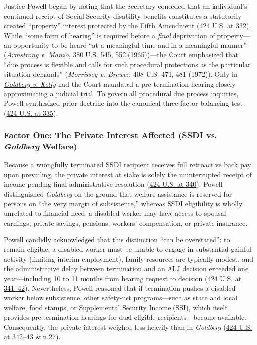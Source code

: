 \documentclass[12pt]{article}
\begin{document}
Justice Powell began by noting that the Secretary conceded that an individual's continued receipt of Social Security disability benefits constitutes a statutorily created ``property'' interest protected by the Fifth Amendment (\href{https://supreme.justia.com/cases/federal/us/424/319/}{424 U.S. at 332}). While ``some form of hearing'' is required before a \emph{final} deprivation of property---an opportunity to be heard ``at a meaningful time and in a meaningful manner'' (\emph{Armstrong v. Manzo}, 380 U.S. 545, 552 (1965))---the Court emphasized that ``due process is flexible and calls for such procedural protections as the particular situation demands'' (\emph{Morrissey v. Brewer}, 408 U.S. 471, 481 (1972)). Only in \href{https://supreme.justia.com/cases/federal/us/397/254/}{\emph{Goldberg v. Kelly}} had the Court mandated a pre-termination hearing closely approximating a judicial trial. To govern all procedural due process inquiries, Powell synthesized prior doctrine into the canonical three-factor balancing test (\href{https://supreme.justia.com/cases/federal/us/424/319/}{424 U.S. at 335}).

\subsubsection{Factor One: The Private Interest Affected (SSDI vs. \emph{Goldberg} Welfare)}

Because a wrongfully terminated SSDI recipient receives full retroactive back pay upon prevailing, the private interest at stake is solely the uninterrupted receipt of income pending final administrative resolution (\href{https://supreme.justia.com/cases/federal/us/424/319/}{424 U.S. at 340}). Powell distinguished \href{https://supreme.justia.com/cases/federal/us/397/254/}{\emph{Goldberg}} on the ground that welfare assistance is reserved for persons on ``the very margin of subsistence,'' whereas SSDI eligibility is wholly unrelated to financial need; a disabled worker may have access to spousal earnings, private savings, pensions, workers' compensation, or private insurance.

Powell candidly acknowledged that this distinction ``can be overstated'': to remain eligible, a disabled worker must be unable to engage in substantial gainful activity (limiting interim employment), family resources are typically modest, and the administrative delay between termination and an ALJ decision exceeded one year---including 10 to 11 months from hearing request to decision (\href{https://supreme.justia.com/cases/federal/us/424/319/}{424 U.S. at 341--42}). Nevertheless, Powell reasoned that if termination pushes a disabled worker below subsistence, other safety-net programs---such as state and local welfare, food stamps, or Supplemental Security Income (SSI), which itself provides pre-termination hearings for dual-eligible recipients---become available. Consequently, the private interest weighed less heavily than in \emph{Goldberg} (\href{https://supreme.justia.com/cases/federal/us/424/319/}{424 U.S. at 342--43 \& n.27}).
\end{document}
